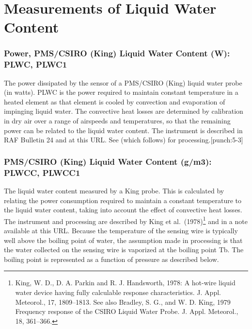 \documentclass[
  english,
]{book}
\begin{document}
\hypertarget{LWC}{%
\section{Measurements of Liquid Water Content}\label{LWC}}

\hypertarget{plwc}{%
\subsubsection*{Power, PMS/CSIRO (King) Liquid Water Content (W): PLWC, PLWC1}\label{plwc}}

The power dissipated by the sensor of a PMS/CSIRO (King) liquid water probe (in watts). PLWC is the power required to maintain constant temperature in a heated element as that element is cooled by convection and evaporation of impinging liquid water. The convective heat losses are determined by calibration in dry air over a range of airspeeds and temperatures, so that the remaining power can be related to the liquid water content. The instrument is described in RAF Bulletin 24 and at this URL. See (which follows) for processing.\protect\hypertarget{punch:5-3}{}{{[}punch:5-3{]}}

\hypertarget{plwcc}{%
\subsubsection*{\texorpdfstring{PMS/CSIRO (King) Liquid Water Content (g/m{3}): PLWCC, PLWCC1}{PMS/CSIRO (King) Liquid Water Content (g/m3): PLWCC, PLWCC1}}\label{plwcc}}

The liquid water content measured by a King probe. This is calculated by relating the power consumption required to maintain a constant temperature to the liquid water content, taking into account the effect of convective heat losses. The instrument and processing are described by King et al.~(1978)\footnote{King, W. D., D. A. Parkin and R. J. Handsworth, 1978: A hot-wire liquid water device having fully calculable response characteristics. J. Appl. Meteorol., 17, 1809--1813. See also Bradley, S. G., and W. D. King, 1979 Frequency response of the CSIRO Liquid Water Probe. J. Appl. Meteorol., 18, 361--366.}
and in a note available at this URL. Because the temperature of the sensing wire is typically well above the boiling point of water, the assumption made in processing is that the water collected on the sensing wire is vaporized at the boiling point {Tb}. The boiling point is represented as a function of pressure as described below.
\end{document}
